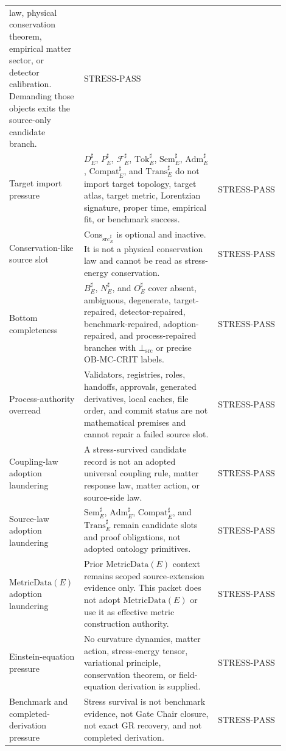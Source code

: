 \documentclass[11pt]{article}
\newcommand{\MetricData}{\mathrm{MetricData}}
\newcommand{\BottomSrc}{\bot_{\mathrm{src}}}
\newcommand{\Tok}{\mathrm{Tok}}
\newcommand{\Sem}{\mathrm{Sem}}
\newcommand{\Adm}{\mathrm{Adm}}
\newcommand{\Trans}{\mathrm{Trans}}
\newcommand{\Compat}{\mathrm{Compat}}
\newcommand{\ConsSrc}{\mathrm{Cons}_{\mathrm{src}}}
\newcommand{\OBMC}{\mathrm{OB}\mbox{-}\mathrm{MC}}
\newcommand{\Fsrc}{\mathcal{F}_{E}^{\sharp}}
\newcommand{\StressPass}{\mathrm{STRESS}\mbox{-}\mathrm{PASS}}
\begin{document}
\begin{longtable}{p{0.25\linewidth}p{0.47\linewidth}p{0.18\linewidth}}
law, physical conservation theorem, empirical matter sector, or detector
calibration. Demanding those objects exits the source-only candidate branch.
& \(\StressPass\) \\
\addlinespace
Target import pressure &
\(D_E^{\sharp}\), \(P_E^{\sharp}\), \(\Fsrc\), \(\Tok_E^{\sharp}\),
\(\Sem_E^{\sharp}\), \(\Adm_E^{\sharp}\), \(\Compat_E^{\sharp}\), and
\(\Trans_E^{\sharp}\) do not import target topology, target atlas, target
metric, Lorentzian signature, proper time, empirical fit, or benchmark
success. & \(\StressPass\) \\
\addlinespace
Conservation-like source slot &
\(\ConsSrc_E^{\sharp}\) is optional and inactive. It is not a physical
conservation law and cannot be read as stress-energy conservation. &
\(\StressPass\) \\
\addlinespace
Bottom completeness &
\(B_E^{\sharp}\), \(N_E^{\sharp}\), and \(O_E^{\sharp}\) cover absent,
ambiguous, degenerate, target-repaired, detector-repaired,
benchmark-repaired, adoption-repaired, and process-repaired branches with
\(\BottomSrc\) or precise \(\OBMC\)-CRIT labels. & \(\StressPass\) \\
\addlinespace
Process-authority overread &
Validators, registries, roles, handoffs, approvals, generated derivatives,
local caches, file order, and commit status are not mathematical premises and
cannot repair a failed source slot. & \(\StressPass\) \\
\addlinespace
Coupling-law adoption laundering &
A stress-survived candidate record is not an adopted universal coupling rule,
matter response law, matter action, or source-side law. & \(\StressPass\) \\
\addlinespace
Source-law adoption laundering &
\(\Sem_E^{\sharp}\), \(\Adm_E^{\sharp}\), \(\Compat_E^{\sharp}\), and
\(\Trans_E^{\sharp}\) remain candidate slots and proof obligations, not
adopted ontology primitives. & \(\StressPass\) \\
\addlinespace
\(\MetricData(E)\) adoption laundering &
Prior \(\MetricData(E)\) context remains scoped source-extension evidence
only. This packet does not adopt \(\MetricData(E)\) or use it as effective
metric construction authority. & \(\StressPass\) \\
\addlinespace
Einstein-equation pressure &
No curvature dynamics, matter action, stress-energy tensor, variational
principle, conservation theorem, or field-equation derivation is supplied. &
\(\StressPass\) \\
\addlinespace
Benchmark and completed-derivation pressure &
Stress survival is not benchmark evidence, not Gate Chair closure, not exact
GR recovery, and not completed derivation. & \(\StressPass\) \\
\bottomrule
\end{longtable}
\end{document}
